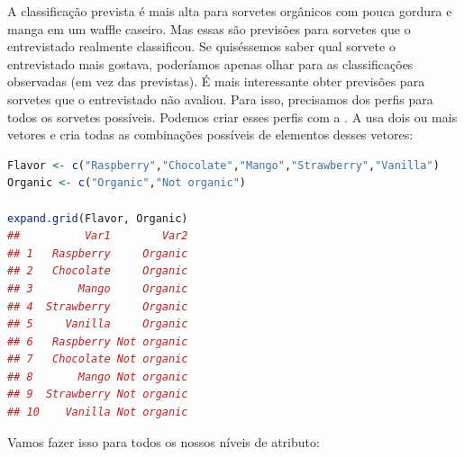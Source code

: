 \documentclass{article}
\begin{document}
A classificação prevista é mais alta para sorvetes orgânicos com pouca gordura e manga em um waffle caseiro. Mas essas são previsões para sorvetes que o entrevistado realmente classificou. Se quiséssemos saber qual sorvete o entrevistado mais gostava, poderíamos apenas olhar para as classificações observadas (em vez das previstas). É mais interessante obter previsões para sorvetes que o entrevistado não avaliou. Para isso, precisamos dos perfis para todos os sorvetes possíveis. Podemos criar esses perfis com a . A  usa dois ou mais vetores e cria todas as combinações possíveis de elementos desses vetores:

\begin{lstlisting}[language=R]
Flavor <- c("Raspberry","Chocolate","Mango","Strawberry","Vanilla")
Organic <- c("Organic","Not organic")

expand.grid(Flavor, Organic)
##          Var1        Var2
## 1   Raspberry     Organic
## 2   Chocolate     Organic
## 3       Mango     Organic
## 4  Strawberry     Organic
## 5     Vanilla     Organic
## 6   Raspberry Not organic
## 7   Chocolate Not organic
## 8       Mango Not organic
## 9  Strawberry Not organic
## 10    Vanilla Not organic
\end{lstlisting}

Vamos fazer isso para todos os nossos níveis de atributo:
\end{document}
